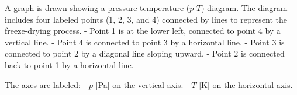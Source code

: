 A graph is drawn showing a pressure-temperature (\( p \)-\( T \)) diagram. The diagram includes four labeled points (1, 2, 3, and 4) connected by lines to represent the freeze-drying process.  
- Point 1 is at the lower left, connected to point 4 by a vertical line.  
- Point 4 is connected to point 3 by a horizontal line.  
- Point 3 is connected to point 2 by a diagonal line sloping upward.  
- Point 2 is connected back to point 1 by a horizontal line.  

The axes are labeled:  
- \( p \) [Pa] on the vertical axis.  
- \( T \) [K] on the horizontal axis.